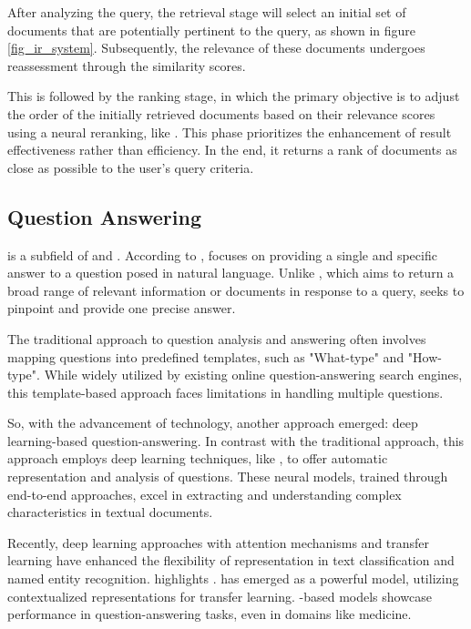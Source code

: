 After analyzing the query, the retrieval stage will select an initial set of documents that are potentially pertinent to the query, as shown in figure \ref{fig_ir_system}. Subsequently, the relevance of these documents undergoes reassessment through the similarity scores. 

This is followed by the ranking stage, in which the primary objective is to adjust the order of the initially retrieved documents based on their relevance scores using a neural reranking, like {\bert}. This phase prioritizes the enhancement of result effectiveness rather than efficiency. In the end, it returns a rank of documents as close as possible to the user's query criteria. 


\subsection{Question Answering}

{\qa} is a subfield of {\ir} and {\nlp}. According to \citet{zhong_building_2020}, {\qa} focuses on providing a single and specific answer to a question posed in natural language. Unlike {\ir}, which aims to return a broad range of relevant information or documents in response to a query, {\qa} seeks to pinpoint and provide one precise answer.

The traditional approach to question analysis and answering often involves mapping questions into predefined templates, such as "What-type" and "How-type". While widely utilized by existing online question-answering search engines, this template-based approach faces limitations in handling multiple questions. 

So, with the advancement of technology, another approach emerged: deep learning-based question-answering. In contrast with the traditional approach, this approach employs deep learning techniques, like {\rnn}, to offer automatic representation and analysis of questions. These neural models, trained through end-to-end approaches, excel in extracting and understanding complex characteristics in textual documents.

Recently, deep learning approaches with attention mechanisms and transfer learning have enhanced the flexibility of representation in text classification and named entity recognition. \citet{zhong_building_2020} highlights {\bert}. {\bert} has emerged as a powerful model, utilizing contextualized representations for transfer learning. {\bert}-based models showcase performance in question-answering tasks, even in domains like medicine.



